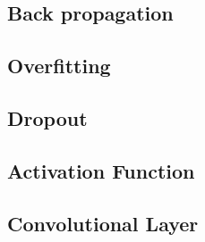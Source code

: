 \subsection{Back propagation}
\subsection{Overfitting}
\subsection{Dropout}
\subsection{Activation Function}
\subsection{Convolutional Layer}